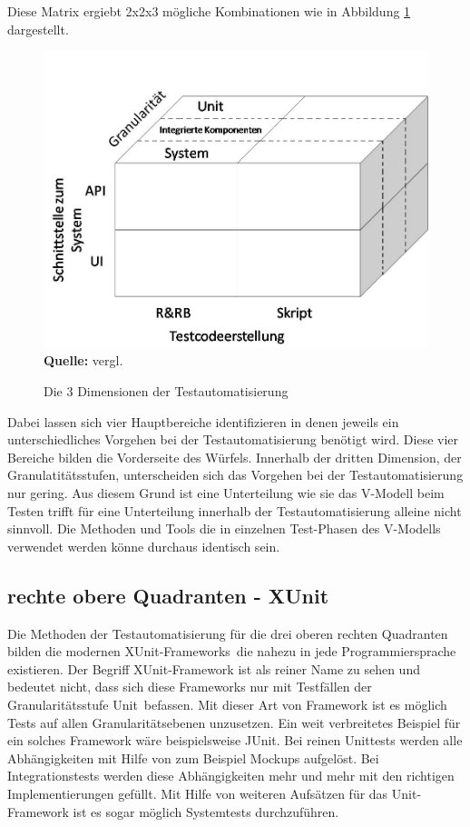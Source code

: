 Diese Matrix ergiebt 2x2x3 mögliche Kombinationen wie in Abbildung \ref{fig:3DimensionenDerTestauto} dargestellt.

\begin{figure}[htb]
  \centering  
  \includegraphics[scale=0.5]{img/methodenTestauto.jpg}\\
  \footnotesize\sffamily\textbf{Quelle:} vergl. \cite{meszaros_agile_2003}
  \caption{Die 3 Dimensionen der Testautomatisierung}
  \label{fig:3DimensionenDerTestauto}
\end{figure}

Dabei lassen sich vier Hauptbereiche identifizieren in denen jeweils ein unterschiedliches Vorgehen bei der Testautomatisierung benötigt wird. Diese vier Bereiche bilden die Vorderseite des Würfels. Innerhalb der dritten Dimension, der Granulatitätsstufen, unterscheiden sich das Vorgehen bei der Testautomatisierung nur gering. Aus diesem Grund ist eine Unterteilung wie sie das V-Modell beim Testen trifft für eine Unterteilung innerhalb der Testautomatisierung alleine nicht sinnvoll. Die Methoden und Tools die in einzelnen Test-Phasen des V-Modells verwendet werden könne durchaus identisch sein.

\subsection{rechte obere Quadranten - XUnit}
Die Methoden der Testautomatisierung für die drei oberen rechten Quadranten bilden die modernen \glqq XUnit-Frameworks\grqq\ die nahezu in jede Programmiersprache existieren. Der Begriff XUnit-Framework ist als reiner Name zu sehen und bedeutet nicht, dass sich diese Frameworks nur mit Testfällen der Granularitätsstufe \glqq Unit\grqq\ befassen. Mit dieser Art von Framework ist es möglich Tests auf allen Granularitätsebenen unzusetzen. Ein weit verbreitetes Beispiel für ein solches Framework wäre beispielsweise JUnit. Bei reinen Unittests werden alle Abhängigkeiten mit Hilfe von zum Beispiel Mockups aufgelöst. Bei Integrationstests werden diese Abhängigkeiten mehr und mehr mit den richtigen Implementierungen gefüllt. Mit Hilfe von weiteren Aufsätzen für das Unit-Framework ist es sogar möglich Systemtests durchzuführen.  

